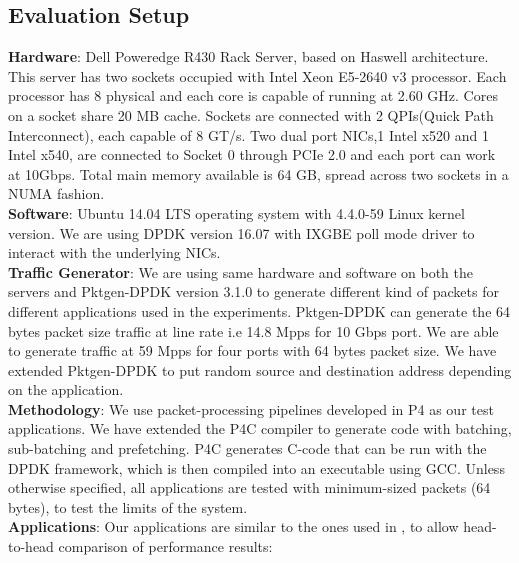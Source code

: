 \subsection{Evaluation Setup}
\textbf{Hardware}: Dell Poweredge R430 Rack Server, based on Haswell architecture. This server has two sockets occupied with Intel Xeon E5-2640 
v3\cite{xeon} processor. Each processor has 8 physical and each core is capable of running at 2.60 GHz. Cores on a socket share 20 MB cache. Sockets are connected with 2 QPIs(Quick Path Interconnect), each capable of 8 GT/s. Two dual port NICs,1 Intel x520 and 1 Intel x540, are connected to Socket 0 through PCIe 2.0 and each port can work at 10Gbps. Total main memory available is 64 GB, spread across two sockets in a NUMA fashion.
\\
\textbf{Software}: Ubuntu 14.04 LTS operating system with 4.4.0-59 Linux kernel version. We are using DPDK version 16.07 with IXGBE poll mode driver to
interact with the underlying NICs. 
\\
\textbf{Traffic Generator}: We are using same hardware and software on both the servers and Pktgen-DPDK\cite{pktgen} version 3.1.0 to generate different kind of packets for different applications used in the experiments. Pktgen-DPDK\cite{pktgen} can generate the 64 bytes packet size traffic at line rate i.e 14.8 Mpps for 10 Gbps port. We are able to generate traffic at 59 Mpps for four ports with 64 bytes packet size. We have extended Pktgen-DPDK\cite{pktgen} to put random source and destination address depending on the application.
\\
\textbf{Methodology}: We use packet-processing pipelines developed in P4\cite{Bosshart:2014:PPP:2656877.2656890} as our test applications. We have extended the P4C\cite{Laki:2016:HSP:2934872.2959080} compiler to generate code with batching, sub-batching and prefetching. P4C\cite{Laki:2016:HSP:2934872.2959080} generates C-code that can be run with the DPDK\cite{DPDK} framework, which is then compiled into an executable using GCC. Unless otherwise specified, all
applications are tested with minimum-sized packets (64 bytes), to test the limits of the system.
\\
\textbf{Applications}: Our applications are similar to the ones used in \cite{189006}, to allow head-to-head comparison of performance results:
